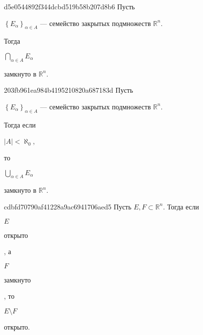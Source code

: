 \begin{note}{d5e0544892f344dcbd519b58b207d8b6}
    Пусть \begin{icloze}{3}\({ \left\{ E_\alpha \right\}_{\alpha \in A} }\) --- семейство закрытых подмножеств \({ \mathbb R^{n} }\).\end{icloze}
    Тогда \begin{icloze}{2}\({ \displaystyle \bigcap_{\alpha \in A}^{} E_\alpha }\)\end{icloze} \begin{icloze}{1}замкнуто в \({ \mathbb R^{n} }\).\end{icloze}
\end{note}

\begin{note}{203fb961ea984b4195210820a687183d}
    Пусть \begin{icloze}{4}\({ \left\{ E_\alpha \right\}_{\alpha \in A} }\) --- семейство закрытых подмножеств \({ \mathbb R^{n} }\).\end{icloze}
    Тогда если \begin{icloze}{3}\({ \left\lvert A \right\rvert < \aleph_0 }\),\end{icloze} то \begin{icloze}{2}\({ \displaystyle \bigcup_{\alpha \in A}^{} E_\alpha }\)\end{icloze} \begin{icloze}{1}замкнуто в \({ \mathbb R^{n} }\).\end{icloze}
\end{note}

\begin{note}{cdbfd70790af41228a9ac6941706aed5}
    Пусть \({ E, F \subset \mathbb R^{n} }\). Тогда если \begin{icloze}{4}\({ E }\)\end{icloze} \begin{icloze}{3}открыто\end{icloze}, а \begin{icloze}{4}\({ F }\)\end{icloze} \begin{icloze}{3}замкнуто\end{icloze}, то \begin{icloze}{2}\({ E \setminus F }\)\end{icloze} \begin{icloze}{1}открыто.\end{icloze}
\end{note}

